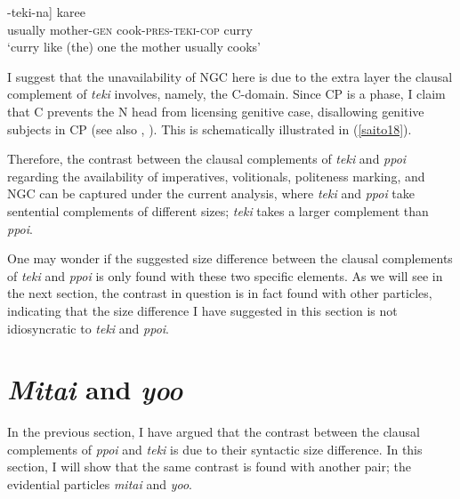 \documentclass[output=paper]{langscibook}
\begin{document}
\begin{exe}
\ex \label{saito17}
\gll *[[{hudan} {okaasan-no} {tuku-ru}]-{teki-na}] {karee}\\
usually mother-\textsc{gen} cook-\textsc{pres-teki-cop} curry\\ 
\glt ‘curry like (the) one the mother usually cooks’
\end{exe}

I suggest that the unavailability of NGC here is due to the extra layer the clausal complement of \emph{teki} involves, namely, the C-domain. Since CP is a phase, I claim that C prevents the N head from licensing genitive case, disallowing genitive subjects in CP (see also \citealt{miyagawa2011}, \citealt{ParkYoo2017}). This is schematically illustrated in (\ref{saito18}). 

\begin{exe}
\ex \label{saito18}
\end{exe}

Therefore, the contrast between the clausal complements of \emph{teki} and \emph{ppoi} regarding the availability of imperatives, volitionals, politeness marking, and NGC can be captured under the current analysis, where \emph{teki} and \emph{ppoi} take sentential complements of different sizes; \emph{teki} takes a larger complement than \emph{ppoi}.

One may wonder if the suggested size difference between the clausal complements of \emph{teki} and \emph{ppoi} is only found with these two specific elements. As we will see in the next section, the contrast in question is in fact found with other particles, indicating that the size difference I have suggested in this section is not idiosyncratic to \emph{teki} and \emph{ppoi}.

\section{\textit{Mitai} and \textit{yoo}} \label{saitos4}

In the previous section, I have argued that the contrast between the clausal complements of \emph{ppoi} and \emph{teki} is due to their syntactic size difference. In this section, I will show that the same contrast is found with another pair; the evidential particles \emph{mitai} and \emph{yoo}.
\end{document}
